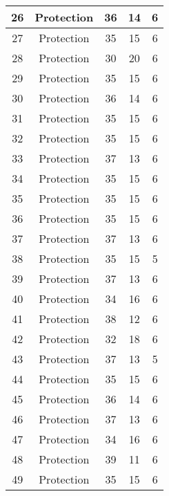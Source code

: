 \documentclass[results.tex]{subfiles}
\begin{document}
\begin{center}
\begin{tabular}{| c || c | c | c | c |}
    \hline
    26 & Protection & 36 & 14 & 6 \\ 
    \hline
    27 & Protection & 35 & 15 & 6 \\ 
    \hline
    28 & Protection & 30 & 20 & 6 \\ 
    \hline
    29 & Protection & 35 & 15 & 6 \\ 
    \hline
    30 & Protection & 36 & 14 & 6 \\ 
    \hline
    31 & Protection & 35 & 15 & 6 \\ 
    \hline
    32 & Protection & 35 & 15 & 6 \\ 
    \hline
    33 & Protection & 37 & 13 & 6 \\ 
    \hline
    34 & Protection & 35 & 15 & 6 \\ 
    \hline
    35 & Protection & 35 & 15 & 6 \\ 
    \hline
    36 & Protection & 35 & 15 & 6 \\ 
    \hline
    37 & Protection & 37 & 13 & 6 \\ 
    \hline
    38 & Protection & 35 & 15 & 5 \\ 
    \hline
    39 & Protection & 37 & 13 & 6 \\ 
    \hline
    40 & Protection & 34 & 16 & 6 \\ 
    \hline
    41 & Protection & 38 & 12 & 6 \\ 
    \hline
    42 & Protection & 32 & 18 & 6 \\ 
    \hline
    43 & Protection & 37 & 13 & 5 \\ 
    \hline
    44 & Protection & 35 & 15 & 6 \\ 
    \hline
    45 & Protection & 36 & 14 & 6 \\ 
    \hline
    46 & Protection & 37 & 13 & 6 \\ 
    \hline
    47 & Protection & 34 & 16 & 6 \\ 
    \hline
    48 & Protection & 39 & 11 & 6 \\ 
    \hline
    49 & Protection & 35 & 15 & 6 \\ 
    \hline   \end{tabular}
\end{center}
\end{document}
